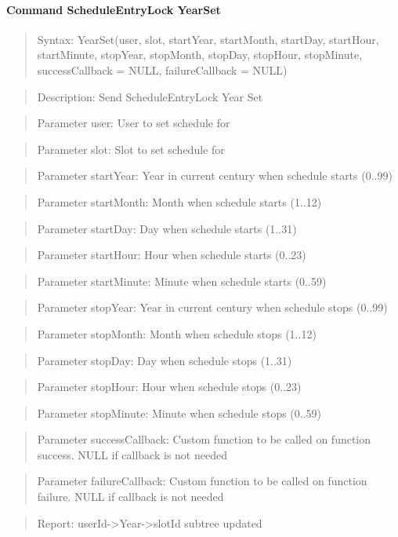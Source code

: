 \paragraph{Command ScheduleEntryLock YearSet}
\begin{quote}Syntax: YearSet(user, slot, startYear, startMonth, startDay, startHour, startMinute, stopYear, stopMonth, stopDay, stopHour, stopMinute, successCallback = NULL, failureCallback = NULL)\end{quote}
\begin{quote}Description: Send ScheduleEntryLock Year Set\end{quote}
\begin{quote}Parameter user: User to set schedule for\end{quote}
\begin{quote}Parameter slot: Slot to set schedule for\end{quote}
\begin{quote}Parameter startYear: Year in current century when schedule starts (0..99)\end{quote}
\begin{quote}Parameter startMonth: Month when schedule starts (1..12)\end{quote}
\begin{quote}Parameter startDay: Day when schedule starts (1..31)\end{quote}
\begin{quote}Parameter startHour: Hour when schedule starts (0..23)\end{quote}
\begin{quote}Parameter startMinute: Minute when schedule starts (0..59)\end{quote}
\begin{quote}Parameter stopYear: Year in current century when schedule stops (0..99)\end{quote}
\begin{quote}Parameter stopMonth: Month when schedule stops (1..12)\end{quote}
\begin{quote}Parameter stopDay: Day when schedule stops (1..31)\end{quote}
\begin{quote}Parameter stopHour: Hour when schedule stops (0..23)\end{quote}
\begin{quote}Parameter stopMinute: Minute when schedule stops (0..59)\end{quote}
\begin{quote}Parameter successCallback: Custom function to be called on function success. NULL if callback is not needed\end{quote}
\begin{quote}Parameter failureCallback: Custom function to be called on function failure. NULL if callback is not needed\end{quote}
\begin{quote}Report: userId->Year->slotId subtree updated\end{quote}


